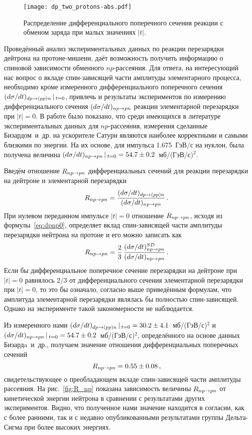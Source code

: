 \begin{figure}[h]
  \centering
  \vspace{-2ex}
  \texttt{[image: dp\_two\_protons-abs.pdf]}
  \vspace{-2ex}
  \caption{Распределение дифференциального поперечного сечения реакции с обменом
    заряда \dpchex при малых значениях $|t|$.}
  \label{fig:dp_two_protons}
\end{figure}

Проведённый анализ экспериментальных данных по реакции перезарядки дейтрона на
протоне-мишени, даёт возможность получить информацию о спиновой зависимости
обменного $np$-рассеяния. Для ответа, на интересующий нас вопрос о вкладе
спин-зависящей части амплитуды элементарного \np процесса, необходимо кроме
измеренного дифференциального поперечного сечения
$(d\sigma/dt)_{dp \rightarrow (pp)n}\,|\,_{t=0}$, привлечь и результаты экспериментов по
измерению дифференциального сечения $(d\sigma/dt)_{np \rightarrow pn}$ реакции элементарной
перезарядки \np при $|t|=0$. В работе было показано, что среди имеющихся в
литературе экспериментальных данных для $np$-рассеяния, измерения сделанные
Бизардом~и~др. на ускорителе Сатурн являются наиболее корректными и самыми
близкими по энергии. На их основе, для импульса 1.675~ГэВ/с на нуклон, была
получена величина
$(d\sigma/dt)_{np \rightarrow pn}\,|\,_{t=0} = 54.7 \pm 0.2$~мб/(ГэВ/с)$^{2}$.

Введём отношение $R_{np \rightarrow pn}$ дифференциальных сечений для реакции перезарядки на
дейтроне \dpchex и элементарной перезарядки \np
\begin{equation}
  R_{np \rightarrow pn} = \frac{(d\sigma/dt)_{dp \rightarrow (pp)n}}{(d\sigma/dt)_{np \rightarrow pn}}\,.
\end{equation}
При нулевом переданном импульсе $|t|=0$ отношение $R_{np \rightarrow pn}$, исходя из
формулы~\eqref{eq:dpnp0}, определяет вклад спин-зависящей части амплитуды
перезарядки нейтрона на протоне и его можно записать как
\begin{equation}
  R_{np \rightarrow pn} = \frac{2}{3}\,\frac{(d\sigma/dt)^{SD}_{np \rightarrow pn}}{(d\sigma/dt)_{np \rightarrow pn}}\,.
\end{equation}
Если бы дифференциальное поперечное сечение перезарядки на дейтроне при $|t|=0$
равнялось $2/3$ от дифференциального сечения элементарной \np перезарядки при
$|t|=0$, то это бы означало, согласно выше приведённым формулам, что амплитуда
элементарной перезарядки являлась бы полностью спин-зависящей. Однако на
эксперименте такой закономерности не наблюдается.

Из измеренного нами
$(d\sigma/dt)_{dp \rightarrow (pp)n}\,|\,_{t=0} = 30.2 \pm 4.1$~мб/(ГэВ/с)$^{2}$ и
$(d\sigma/dt)_{np \rightarrow pn}\,|\,_{t=0} = 54.7 \pm 0.2$~мб/(ГэВ/с)$^{2}$, определённого
на основе данных Бизардa~и~др., получаем значение отношения дифференциальных
поперечных сечений
\begin{equation}
  R_{np \rightarrow pn} = 0.55 \pm 0.08\,,
\end{equation}
свидетельствующее о преобладающем вкладе спин-зависящей части амплитуды \np
рассеяния. На рис.~\ref{fig:R_np} показана зависимость величины $R_{np \rightarrow pn}$ от
кинетической энергии нейтрона в сравнении с результатами других экспериментов.
Видно, что полученное нами значение находится в согласии, как с более ранними,
так и с недавно опубликованными результатами группы Дельта-Сигма при более
высоких энергиях.

